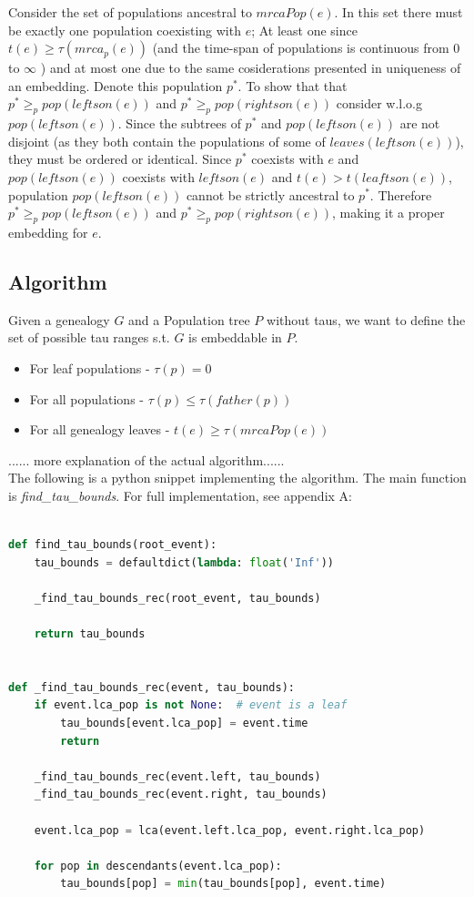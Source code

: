 \documentclass[11pt]{article}
\newcommand{\1}{\mathbbm{1}}
\begin{document}
Consider the set of populations ancestral to $mrcaPop(e)$. In this set there must be exactly one population coexisting with $e$; At least one since $t(e) \geq \tau(mrca_p(e))$ (and the time-span of populations is continuous from 0 to $\infty$ ) and at most one due to the same cosiderations presented in uniqueness of an embedding. Denote this population $p^*$. 	To show that that $p^* \geq_p pop(leftson(e))$ and $p^* \geq_p pop(rightson(e))$ consider w.l.o.g $pop(leftson(e))$. Since the subtrees of $p^*$ and $pop(leftson(e))$ are not disjoint (as they both contain the populations of some of $leaves(leftson(e))$), they must be ordered or identical.
Since $p^*$ coexists with $e$ and $pop(leftson(e))$ coexists with $leftson(e)$ and $t(e) > t(leaftson(e))$, population $pop(leftson(e))$ cannot be strictly ancestral to $p^*$.
Therefore $p^* \geq_p pop(leftson(e))$ and $p^* \geq_p pop(rightson(e))$, making it a proper embedding for $e$.


\subsection{Algorithm}
Given a genealogy $G$ and a Population tree $P$ without taus, we want to define the set of possible tau ranges s.t. $G$ is embeddable in $P$.\\

\begin{itemize}
\item For leaf populations - $\tau(p) = 0$ 

\item For all populations - $\tau(p) \leq \tau(father(p))$

\item For all genealogy leaves - $t(e) \geq \tau(mrcaPop(e))$

\end{itemize}
...... more explanation of the actual algorithm......\\


The following is a python snippet implementing the algorithm. The main function is \textit{find\_tau\_bounds}. For full implementation, see appendix A:



\begin{lstlisting}[language=Python]

def find_tau_bounds(root_event):
    tau_bounds = defaultdict(lambda: float('Inf'))

    _find_tau_bounds_rec(root_event, tau_bounds)

    return tau_bounds


def _find_tau_bounds_rec(event, tau_bounds):
    if event.lca_pop is not None:  # event is a leaf
        tau_bounds[event.lca_pop] = event.time
        return

    _find_tau_bounds_rec(event.left, tau_bounds)
    _find_tau_bounds_rec(event.right, tau_bounds)

    event.lca_pop = lca(event.left.lca_pop, event.right.lca_pop)

    for pop in descendants(event.lca_pop):
        tau_bounds[pop] = min(tau_bounds[pop], event.time)
\end{lstlisting}
\end{document}

